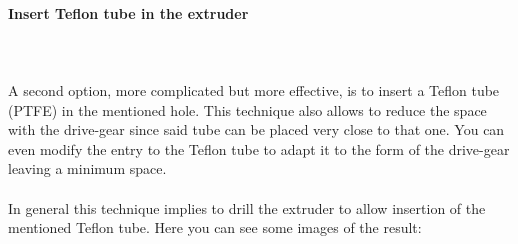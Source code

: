 \documentclass[11pt,a4paper]{article}
\begin{document}
			\paragraph{Insert Teflon tube in the extruder}\mbox{}\\\\
A second option, more complicated but more effective, is to insert a Teflon tube (PTFE) in the mentioned hole. This technique also allows to reduce the space with the drive-gear since said tube can be placed very close to that one. You can even modify the entry to the Teflon tube to adapt it to the form of the drive-gear leaving a minimum space.
\\\\
In general this technique implies to drill the extruder to allow insertion of the mentioned Teflon tube. Here you can see some images of the result:
\end{document}

